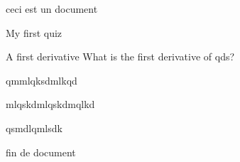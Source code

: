 \documentclass{article}
\begin{document}
ceci est un document

\begin{quiz}{My first quiz}
\begin{multi}[points=3]{A first derivative}
What is the first derivative of qds? 
\item qmmlqksdmlkqd
\item *mlqskdmlqskdmqlkd
\item qsmdlqmlsdk
\end{multi}
\end{quiz}



fin de document
\end{document}
